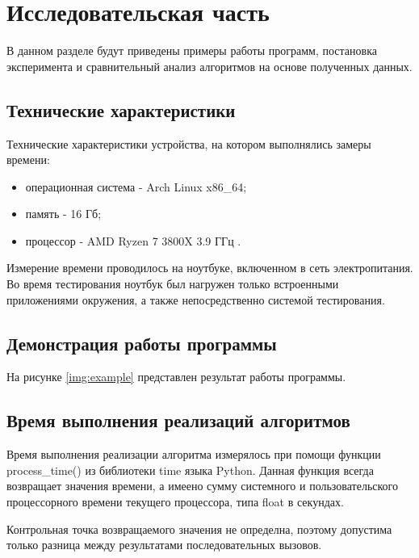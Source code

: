 \chapter{Исследовательская часть}

В данном разделе будут приведены примеры работы программ, постановка эксперимента и сравнительный анализ алгоритмов на основе полученных данных.

\section{Технические характеристики}

Технические характеристики устройства, на котором выполнялись замеры времени:

\begin{itemize}
	\item операционная система - Arch \cite{ubuntu} Linux \cite{linux} x86\_64;
	\item память - 16 Гб;
	\item процессор - AMD Ryzen 7 3800X 3.9 ГГц \cite{intel}.
\end{itemize}

Измерение времени проводилось на ноутбуке, включенном в сеть электропитания. Во время тестирования ноутбук был нагружен только встроенными приложениями окружения, а также непосредственно системой тестирования.

\section{Демонстрация работы программы}


На рисунке \ref{img:example} представлен результат работы программы.
\pagebreak

\section{Время выполнения реализаций алгоритмов}

Время выполнения реализации алгоритма измерялось при помощи функции process\_time() \cite{pythonlangtime} из библиотеки time языка Python. Данная функция всегда возвращает значения времени, а имеено сумму системного и пользовательского процессорного времени текущего процессора, типа float в секундах.

Контрольная точка возвращаемого значения не определна, поэтому допустима только разница между результатами последовательных вызовов.

